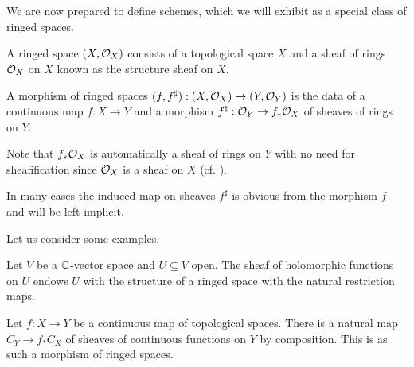 We are now prepared to define schemes, which we will exhibit as a special class of ringed spaces. 
\begin{definition}\label{def: ringed space}
    A ringed space $(X,\mathcal{O}_{X})$ consists of a topological space $X$ and a sheaf of rings $\mathcal{O}_{X}$ on $X$ known as the structure sheaf on $X$. 
\end{definition}
\begin{definition}\label{def: morphism of ringed spaces}
    A morphism of ringed spaces $(f,f^{\sharp}):(X,\mathcal{O}_{X})\to (Y,\mathcal{O}_{Y})$ is the data of a continuous map $f:X\to Y$ and a morphism $f^{\sharp}:\mathcal{O}_{Y}\to f_{*}\mathcal{O}_{X}$ of sheaves of rings on $Y$. 
\end{definition}
\begin{remark}
    Note that $f_{*}\mathcal{O}_{X}$ is automatically a sheaf of rings on $Y$ with no need for sheafification since $\mathcal{O}_{X}$ is a sheaf on $X$ (cf. ). 
\end{remark}
\begin{remark}
    In many cases the induced map on sheaves $f^{\sharp}$ is obvious from the morphism $f$ and will be left implicit. 
\end{remark}
Let us consider some examples. 
\begin{example}
    Let $V$ be a $\mathbb{C}$-vector space and $U\subseteq V$ open. The sheaf of holomorphic functions on $U$ endows $U$ with the structure of a ringed space with the natural restriction maps. 
\end{example}
\begin{example}
    Let $f:X\to Y$ be a continuous map of topological spaces. There is a natural map $C_{Y}\to f_{*}C_{X}$ of sheaves of continuous functions on $Y$ by composition. This is as such a morphism of ringed spaces. 
\end{example}